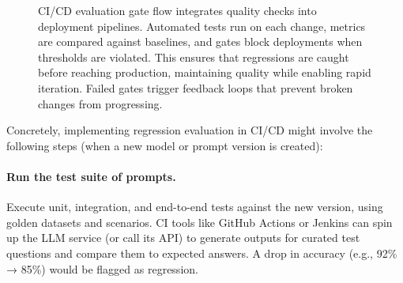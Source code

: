 \begin{figure}[t]
\centering
\begin{llmfigbox}
\end{llmfigbox}
\caption{CI/CD evaluation gate flow integrates quality checks into deployment pipelines. Automated tests run on each change, metrics are compared against baselines, and gates block deployments when thresholds are violated. This ensures that regressions are caught before reaching production, maintaining quality while enabling rapid iteration. Failed gates trigger feedback loops that prevent broken changes from progressing.}
\label{fig:ch10_cicd_gate_flow}
\end{figure}  

Concretely, implementing regression evaluation in CI/CD might involve the following steps (when a new model or prompt version is created):

\paragraph*{Run the test suite of prompts.}  
Execute unit, integration, and end-to-end tests against the new version, using golden datasets and scenarios. CI tools like GitHub Actions or Jenkins can spin up the LLM service (or call its API) to generate outputs for curated test questions and compare them to expected answers. A drop in accuracy (e.g., 92\% → 85\%) would be flagged as regression.


